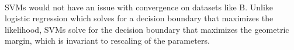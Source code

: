 \begin{answer}\\
SVMs would not have an issue with convergence on datasets like B. Unlike logistic regression which solves for a decision boundary that maximizes the likelihood, SVMs solve for the decision boundary that maximizes the geometric margin, which is invariant to rescaling of the parameters.
\end{answer}
